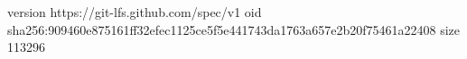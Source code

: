 version https://git-lfs.github.com/spec/v1
oid sha256:909460e875161ff32efec1125ce5f5e441743da1763a657e2b20f75461a22408
size 113296
